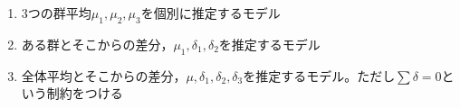 \begin{enumerate}
	\item 3つの群平均$\mu_1,\mu_2,\mu_3$を個別に推定するモデル
	\item ある群とそこからの差分，$\mu_1,\delta_1,\delta_2$を推定するモデル
	\item 全体平均とそこからの差分，$\mu,\delta_1,\delta_2,\delta_3$を推定するモデル。ただし$\sum \delta = 0$という制約をつける
\end{enumerate}

